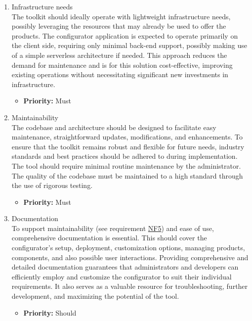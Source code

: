 \begin{enumerate}[label=\textbf{NF\arabic*:}, leftmargin=*]
\item \label{itm:NF4} Infrastructure needs
\vspace{2pt}
\\The toolkit should ideally operate with lightweight infrastructure needs, possibly leveraging the resources that may already be used to offer the products. The configurator application is expected to operate primarily on the client side, requiring only minimal back-end support, possibly making use of a simple serverless architecture if needed. This approach reduces the demand for maintenance and is for this solution cost-effective, improving existing operations without necessitating significant new investments in infrastructure.
\begin{itemize}[noitemsep, label=\trianglebullet]
    \item \textbf{Priority:} Must
\end{itemize}
\vspace{4pt}

\item \label{itm:NF5} Maintainability
\vspace{2pt}
\\The codebase and architecture should be designed to facilitate easy maintenance, straightforward updates, modifications, and enhancements. To ensure that the toolkit remains robust and flexible for future needs, industry standards and best practices should be adhered to during implementation. The tool should require minimal routine maintenance by the administrator. The quality of the codebase must be maintained to a high standard through the use of rigorous testing.
\begin{itemize}[noitemsep, label=\trianglebullet]
    \item \textbf{Priority:} Must
\end{itemize}
\vspace{4pt}

\item Documentation
\vspace{2pt}
\\To support maintainability (see requirement \hyperref[itm:NF5]{NF5}) and ease of use, comprehensive documentation is essential. This should cover the configurator's setup, deployment, customization options, managing products, components, and also possible user interactions. Providing comprehensive and detailed documentation guarantees that administrators and developers can efficiently employ and customize the configurator to suit their individual requirements. It also serves as a valuable resource for troubleshooting, further development, and maximizing the potential of the tool.
\begin{itemize}[noitemsep, label=\trianglebullet]
    \item \textbf{Priority:} Should
\end{itemize}
\vspace{4pt}


\end{enumerate}
